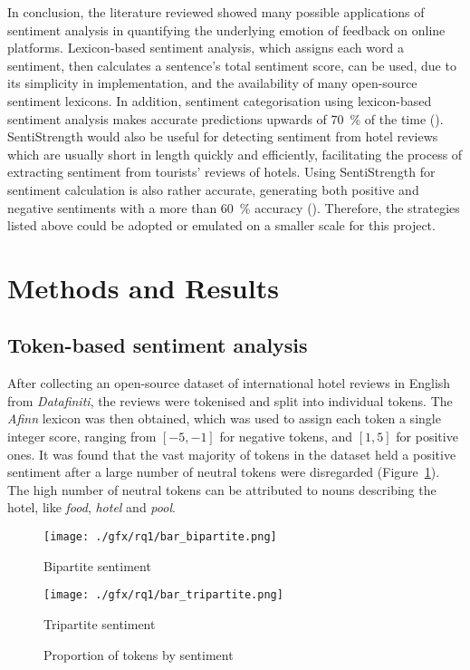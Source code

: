 \documentclass[12pt, a4paper]{pancake-article}
\begin{document}
In conclusion, the literature reviewed showed many possible applications
of sentiment analysis in quantifying the underlying emotion of feedback
on online platforms. Lexicon-based sentiment analysis, which assigns each
word a sentiment, then calculates a sentence's total sentiment score, can
be used, due to its simplicity in implementation, and the availability of
many open-source sentiment lexicons. In addition, sentiment categorisation
using lexicon-based sentiment analysis makes accurate predictions upwards of
\qty{70}{\percent} of the time (\cite{khoo}). SentiStrength would also be useful for
detecting sentiment from hotel reviews which are usually short in length quickly
and efficiently, facilitating the process of extracting sentiment from tourists'
reviews of hotels. Using SentiStrength for sentiment calculation is also
rather accurate, generating both positive and negative sentiments with a more
than \qty{60}{\percent} accuracy (\cite{thelwall}). Therefore, the strategies listed
above could be adopted or emulated on a smaller scale for this project.

\section{Methods and Results}

\subsection{Token-based sentiment analysis}\label{sec:tokens}
After collecting an open-source dataset of international hotel reviews in English from \textit{Datafiniti},
the reviews were tokenised and split into individual tokens. The \textit{Afinn} lexicon was then obtained,
which was used to assign each token a single integer score, ranging from \(\left[-5, -1\right]\) for
negative tokens, and \(\left[1, 5\right]\) for positive ones. It was found that the vast majority
of tokens in the dataset held a positive sentiment  after a large number of neutral tokens were disregarded
(Figure~\ref{fig:bars}). The high number of neutral tokens can be attributed to nouns
describing the hotel, like \textit{food},
\textit{hotel} and \textit{pool}.

\begin{figure}[htpb]
	\centering
	\begin{minipage}{0.5\textwidth}
		\centering
		\texttt{[image: ./gfx/rq1/bar\_bipartite.png]}
		\caption*{Bipartite sentiment}
	\end{minipage}\hfill
	\begin{minipage}{0.5\textwidth}
		\centering
		\texttt{[image: ./gfx/rq1/bar\_tripartite.png]}
		\caption*{Tripartite sentiment}
	\end{minipage}
	\caption{Proportion of tokens by sentiment}
	\label{fig:bars}
\end{figure}
\end{document}
